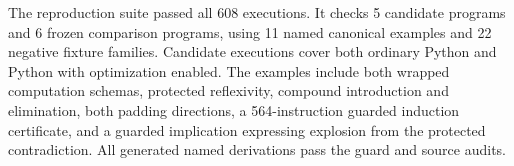 The reproduction suite passed all 608 executions. It checks 5 candidate programs and 6 frozen comparison programs, using 11 named canonical examples and 22 negative fixture families. Candidate executions cover both ordinary Python and Python with optimization enabled. The examples include both wrapped computation schemas, protected reflexivity, compound introduction and elimination, both padding directions, a 564-instruction guarded induction certificate, and a guarded implication expressing explosion from the protected contradiction. All generated named derivations pass the guard and source audits.
